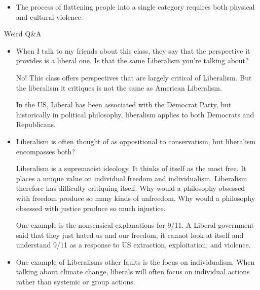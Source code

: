 \documentclass{report}
\begin{document}
\begin{description}
\begin{itemize}
            \item The process of flattening people into a single category
                requires both physical and cultural violence.
        \end{itemize}
    \item {\large Weird Q\&A}
        \begin{itemize}
            \item When I talk to my friends about this class,
                they say that the perspective it provides is a
                liberal one. Is that the same Liberalism you're
                talking about?

                \vspace{10}

                No! This class offers perspectives that are largely
                critical of Liberalism. But the liberalism it critiques
                is not the same as American Liberalism.

                In the US, Liberal has been associated with the Democrat
                Party, but historically in political philosophy, liberalism
                applies to both Democrats and Republicans.

            \item Liberalism is often thought of as oppositional to conservatism,
                but liberalism encompasses both?

                \vspace{10}

                Liberalism is a supremacist ideology. It thinks of itself as
                the most free. It places a unique value on individual freedom
                and individualism. Liberalism therefore has difficulty
                critiquing itself. Why would a philosophy obsessed with freedom
                produce so many kinds of unfreedom. Why would a philosophy
                obsessed with justice produce so much injustice.

                One example is the nonsensical explanations for 9/11. A Liberal
                government said that they just hated us and our freedom, it
                cannot look at itself and understand 9/11 as a response to
                US extraction, exploitation, and violence.

            \item One example of Liberalisms other faults is the focus on individualism.
                When talking about climate change, liberals will often focus on individual
                actions rather than systemic or group actions.


\end{itemize}
\end{description}
\end{document}
